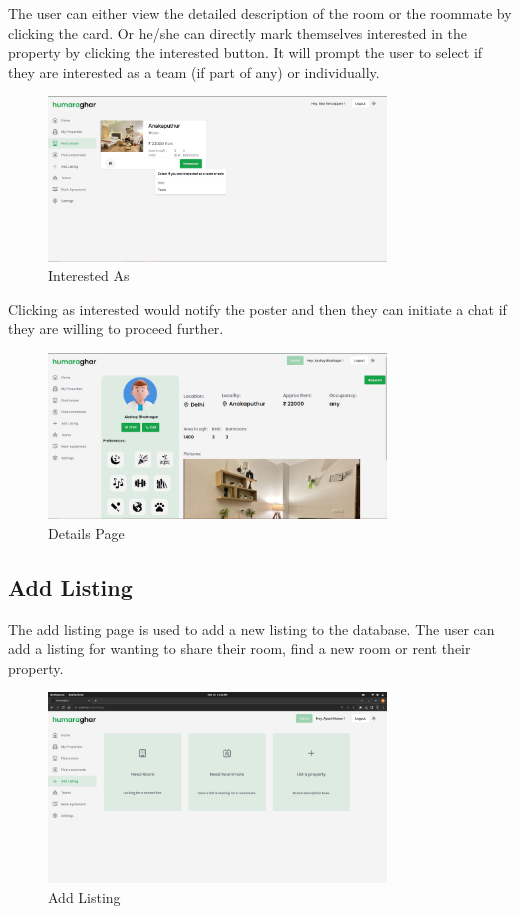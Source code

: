\clearpage

The user can either view the detailed description of the room or the roommate by clicking the card. Or he/she can
directly mark themselves interested in the property by clicking the interested button. It will prompt the user to select
if they are interested as a team (if part of any) or individually.

\begin{figure}[h]
    \centering
    \includegraphics[width=0.8\textwidth]{Images/screenshots/interestedas.PNG}
    \caption{Interested As}
\end{figure}

Clicking as interested would notify the poster and then they can initiate a chat if they are willing to proceed further.
\begin{figure}[h]
    \centering
    \includegraphics[width=0.8\textwidth]{Images/screenshots/userpage.PNG}
    \caption{Details Page}
\end{figure}
\clearpage

\subsection{Add Listing}
The add listing page is used to add a new listing to the database. The user can add a listing for wanting to share their room, find a new room or rent their property.
\begin{figure}[h]
    \centering
    \includegraphics[width=0.8\textwidth]{Images/screenshots/addlisting.png}
    \caption{Add Listing}
\end{figure}

